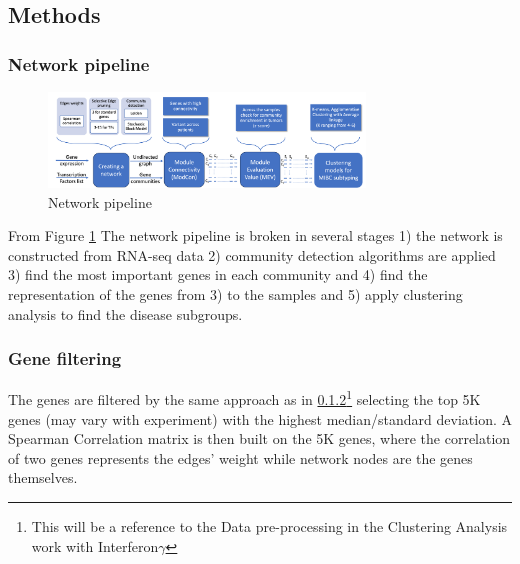 \subsection{Methods} 

\subsubsection{Network pipeline}


\begin{figure}[!htb]
    \centering\includegraphics[width=0.75\textwidth,height=0.75\textheight,keepaspectratio]{Sections/Network_I/Resources/Methods/network_pipeline.png}
    \caption{Network pipeline}
    \label{fig:N_I:network_pipeline}
\end{figure}


From Figure \ref{fig:N_I:network_pipeline} The network pipeline is broken in several stages 1) the network is constructed from RNA-seq data 2) community detection algorithms are applied 3) find the most important genes in each community and 4) find the representation of the genes from 3) to the samples and 5) apply clustering analysis to find the disease subgroups.


\subsubsection{Gene filtering}
The genes are filtered by the same approach as in \ref{}\footnote{This will be a reference to the Data pre-processing in the Clustering Analysis work with Interferon$\gamma$} selecting the top 5K genes (may vary with experiment) with the highest median/standard deviation. A Spearman Correlation matrix is then built on the 5K genes, where the correlation of two genes represents the edges' weight while network nodes are the genes themselves. 

